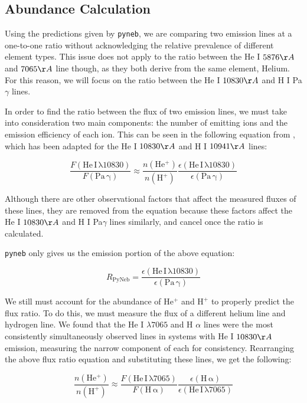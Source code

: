 \documentclass[letterpaper]{aastex701}
\begin{document}
\subsection{Abundance Calculation}
Using the predictions given by \texttt{pyneb}, we are comparing two emission lines at a one-to-one ratio without acknowledging the relative prevalence of different element types. This issue does not apply to the ratio between the He I $5876\AA$ and $7065\AA$ line though, as they both derive from the same element, Helium. For this reason, we will focus on the ratio between the He I $10830\AA$ and H I Pa$\gamma$ lines.

In order to find the ratio between the flux of two emission lines, we must take into consideration two main components: the number of emitting ions and the emission efficiency of each ion. This can be seen in the following equation from \citet{Aver_2013}, which has been adapted for the He I $10830\AA$ and H I $10941\AA$ lines:

\[
\frac{F(\mathrm{He\,I\,\lambda10830})}{F(\mathrm{Pa\,\gamma})}
\approx
\frac{n(\mathrm{He^+})}{n\mathrm{(H^+)}}
\frac{\epsilon(\mathrm{He\,I\,\lambda10830})}{\epsilon(\mathrm{Pa\,\gamma})}
\]

Although there are other observational factors that affect the measured fluxes of these lines, they are removed from the equation because these factors affect the He I $10830\AA$ and H I Pa$\gamma$ lines similarly, and cancel once the ratio is calculated.

\texttt{pyneb} only gives us the emission portion of the above equation:

\[
R_{\mathrm{PyNeb}} = \frac{\epsilon(\mathrm{He\,I\,\lambda10830})}{\epsilon(\mathrm{Pa\,\gamma})}
\]

We still must account for the abundance of $\mathrm{He^+}$ and $\mathrm{H^+}$ to properly predict the flux ratio. To do this, we must measure the flux of a different helium line and hydrogen line. We found that the He I $\lambda7065$ and H $\alpha$ lines were the most consistently simultaneously observed lines in systems with He I $10830\AA$ emission, measuring the narrow component of each for consistency. Rearranging the above flux ratio equation and substituting these lines, we get the following:

\[
\frac{n(\mathrm{He^+})}{n\mathrm{(H^+)}}
\approx
\frac{F(\mathrm{He\,I\,\lambda7065})}{F(\mathrm{H\,\alpha})}
\frac{\epsilon(\mathrm{H\,\alpha})}{\epsilon(\mathrm{He\,I\,\lambda7065})}
\]
\end{document}
